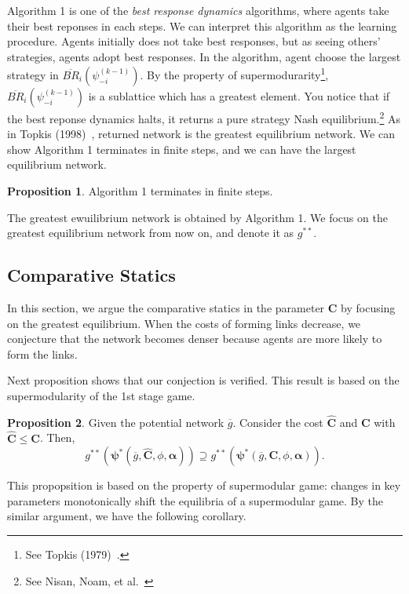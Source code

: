 \documentclass[12pt]{article}
\theoremstyle{definition}
\newtheorem{proposition}{Proposition}
\newcommand{\bm}[1]{\boldsymbol{#1}}
\begin{document}
Algorithm 1 is one of the {\it{best response dynamics}} algorithms, where agents take their best reponses in each steps.
We can interpret this algorithm as the learning procedure.
Agents initially does not take best responses, but as seeing others' strategies, agents adopt best responses.
In the algorithm, agent choose the largest strategy in $\overline{BR}_i(\psi_{-i}^{(k-1)})$.
By the property of supermodurarity\footnote{See Topkis (1979)~\cite{topkis1979}.}, $\overline{BR}_i(\psi_{-i}^{(k-1)})$ is a sublattice which has a greatest element.
You notice that if the best reponse dynamics halts, it returns a pure strategy Nash equilibrium.\footnote{See Nisan, Noam, et al.~\cite{AGT}}
As in Topkis (1998)~\cite{topkis1998}, returned network is the greatest equilibrium network.
We can show Algorithm 1 terminates in finite steps, and we can have the largest equilibrium network.

\begin{proposition}
Algorithm 1 terminates in finite steps.
\end{proposition}

The greatest ewuilibrium network is obtained by Algorithm 1.
We focus on the greatest equilibrium network from now on, and denote it as $g^{**}$.


\subsection{Comparative Statics}

In this section, we argue the comparative statics in the parameter $\bm{C}$ by focusing on the greatest equilibrium.
When the costs of forming links decrease, we conjecture that the network becomes denser because agents are more likely to form the links.

Next proposition shows that our conjection is verified.
This result is based on the supermodularity of the 1st stage game.

\begin{proposition}
Given the potential network $\overline{g}$.
Consider the cost $\bm{\hat{C}}$ and $\bm{C}$ with $\bm{\hat{C}} \le \bm{C}$.
Then,
\[ g^{**}(\bm{\psi}^*(\overline{g}, \bm{\hat{C}}, \phi, \bm{\alpha})) \supseteq g^{**}(\bm{\psi}^*(\overline{g}, \bm{C}, \phi, \bm{\alpha})). \]
\end{proposition}

This propopsition is based on the property of supermodular game: changes in key parameters monotonically shift the equilibria of a supermodular game.
By the similar argument, we have the following corollary.
\end{document}
